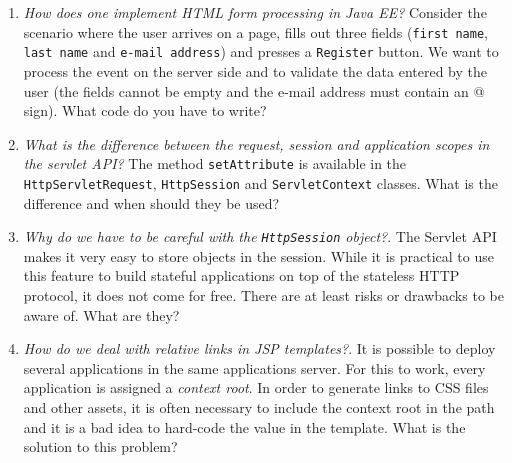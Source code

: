 \begin{enumerate}
\item \emph{How does one implement HTML form processing in Java EE?} Consider the scenario where the user arrives on a page, fills out three fields (\texttt{first name}, \texttt{last name} and \texttt{e-mail address}) and presses a \texttt{Register} button. We want to process the event on the server side and to validate the data entered by the user (the fields cannot be empty and the e-mail address must contain an @ sign). What code do you have to write?
\item \emph{What is the difference between the request, session and application scopes in the servlet API?} The method \texttt{setAttribute} is available in the \texttt{HttpServletRequest}, \texttt{HttpSession} and \texttt{ServletContext} classes. What is the difference and when should they be used?
\item \emph{Why do we have to be careful with the \texttt{HttpSession} object?}. The Servlet API makes it very easy to store objects in the session. While it is practical to use this feature to build stateful applications on top of the stateless HTTP protocol, it does not come for free. There are at least risks or drawbacks to be aware of. What are they?
\item \emph{How do we deal with relative links in \ac{JSP} templates?}. It is possible to deploy several applications in the same applications server. For this to work, every application is assigned a \emph{context root}. In order to generate links to CSS files and other assets, it is often necessary to include the context root in the path and it is a bad idea to hard-code the value in the template. What is the solution to this problem?
\end{enumerate}


